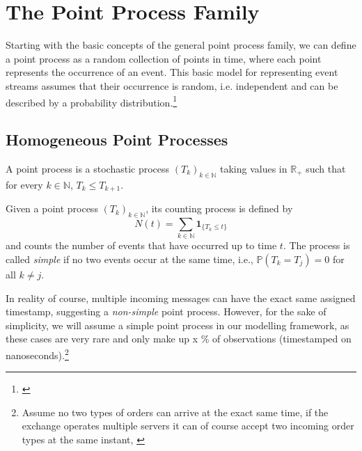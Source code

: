 \documentclass[12pt,a4paper]{cau_thesis}
\begin{document}
\section{The Point Process Family}\label{sec:point_process_family}
Starting with the basic concepts of the general point process family,
we can define a point process as a random collection of points in
time, where each point represents the occurrence of an event. This
basic model for representing event streams assumes that their
occurrence is random, i.e. independent and can be described by a
probability
distribution.\footnote{\cite{palm1943intensitatsschwankungen}}
\subsection{Homogeneous Point Processes}\label{sub_sec:homogeneous_point_processes}
\cite[See ][, p.3]{oxford_hawkes_2020}
\begin{definition}\label{def:point_process}
    A point process is a stochastic process $(T_k)_{k\in\mathbb{N}}$
    taking values in $\mathbb{R}_{+}$ such that for every $k\in\mathbb{N}$, $T_k \leq T_{k+1}$.
\end{definition}

\begin{definition}\label{def:counting_process}
    Given a point process $(T_k)_{k\in\mathbb{N}}$, its counting process is defined by
    \begin{equation}\label{eq:counting_function}
        N(t)=\sum_{k\in\mathbb{N}}\mathbf{1}_{\{T_k\le t\}}
    \end{equation}
    and counts the number of events that have occurred up to time $t$. The
    process is called \emph{simple} if no two events occur at the same time,
    i.e., $\mathbb{P}(T_k=T_j)=0$ for all $k\neq j$.
\end{definition}
In reality of course, multiple incoming messages can have the exact same assigned timestamp,
suggesting a \emph{non-simple} point process. However, for the sake of simplicity,
we will assume a simple point process in our modelling framework, as these cases are very
rare and only make up x \% of observations (timestamped on nanoseconds).\footnote{Assume no two types
    of orders can arrive at the exact same time, if the exchange operates multiple
    servers it can of course accept two incoming order types at the same instant, \cite[see ][p. 45]{law2015pure}}
\end{document}

